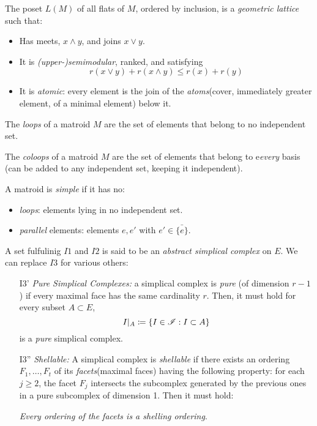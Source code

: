 \begin{definition}
    The poset $L(M)$ of all flats of $M$, ordered by inclusion, is a \textit{geometric lattice} such that:
    \begin{itemize}
        \item Has meets, $x \wedge y$, and joins $x \vee y$.
        \item It is \textit{(upper-)semimodular}, ranked, and satisfying
            $$ r(x \vee y) + r(x \wedge y) \leq r(x) + r(y) $$
        \item It is \textit{atomic}: every element is the join of the \textit{atoms}(cover, immediately greater element, of a minimal element) below it.
    \end{itemize}
\end{definition}

\begin{definition}
    The \textit{loops} of a matroid $M$ are the set of elements that belong to no independent set.

    The \textit{coloops} of a matroid $M$ are the set of elements that belong to e\textit{every} basis (can be added to any independent set, keeping it independent).
\end{definition}

\begin{definition}
    A matroid is \textit{simple} if it has no:
    \begin{itemize}
        \item \textit{loops}: elements lying in no independent set.
        \item \textit{parallel} elements: elements $e, e'$ with $e' \in \bar{\{ e \}}$.
    \end{itemize}
\end{definition}

\begin{definition}
    A set fulfulinig $I1$ and $I2$ is said to be an \textit{abstract simplical complex} on $E$.
    We can replace $I3$ for various others:
    \begin{enumerate}
        \item[I3'] \textit{Pure Simplical Complexes:} a simplical complex is \textit{pure} (of dimension $r-1$) if every maximal face has the same cardinality $r$.
            Then, it must hold for every subset $A \subset E$,
            $$I|_A \coloneqq \{ I \in \mathscr{I} : I \subset A \}$$
            is a \textit{pure} simplical complex.
        \item[I3''] \textit{Shellable:} A simplical complex is \textit{shellable} if there exists an ordering $F_1, \dots, F_t$ of its \textit{facets}(maximal faces) having the following property: for each $j \geq 2$, the facet $F_j$ intersects the subcomplex generated by the previous ones in  a pure subcomplex of dimension 1.
            Then it must hold:

            \textit{Every ordering of the facets is a shelling ordering}.
    \end{enumerate}
\end{definition}

